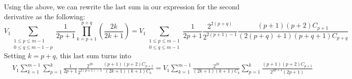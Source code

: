 \documentclass[11pt]{article}
\theoremstyle{definition}
\theoremstyle{definition}
\theoremstyle{plain}
\theoremstyle{plain}
\theoremstyle{plain}
\theoremstyle{definition}
\begin{document}
Using the above, we can rewrite the last sum in our expression for the second derivative as the following:
\begin{equation*}
V_{1}\sum\limits_{\substack{1\leq p \leq m-1 \\ 0 \leq q \leq m - 1 - p}}\frac{1}{2p+1}\prod\limits_{k=p+1}^{p+q}\left(\frac{2k}{2k+1}\right) = V_1\sum\limits_{\substack{1\leq p \leq m-1 \\ 0 \leq q \leq m-1}} \frac{1}{2p+1}\frac{2^{2(p+q)}}{2^{2(p+1)-1}}\frac{(p+1)(p+2)C_{p+1}}{(2(p+q)+1)(p+q+1)C_{p+q}}
\end{equation*}
Setting $k = p+q$, this last sum turns into
\begin{align*}
&V_1\sum\limits_{k=1}^{m-1}\sum\limits_{p=1}^k\frac{1}{2p+1}\frac{2^{2k}}{2^{2(p+1)-1}}\frac{(p+1)(p+2)C_{p+1}}{(2k+1)(k+1)C_k} = V_1\sum\limits_{k=1}^{m-1}\frac{2^{2k}}{(2k+1)(k+1)C_k}\sum\limits_{p=1}^k\frac{(p+1)(p+2)C_{p+1}}{2^{2p+1}(2p+1)}
\end{align*}

\nocite{*}


\end{document}
